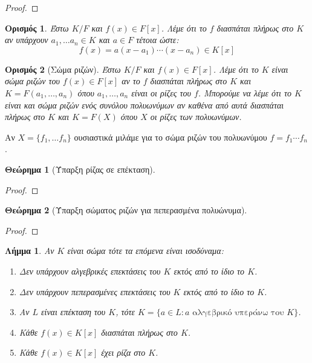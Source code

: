 \documentclass[oneside,a4paper]{article}
\newtheorem{theorem}{Θεώρημα}
\newtheorem{lemma}{Λήμμα}
\newtheorem*{defn}{Ορισμός}
\begin{document}
\begin{proof}
\end{proof}

\begin{defn} Έστω $K/F$ και $f(x) \in F[x]$. Λέμε ότι το $f$ διασπάται πλήρως στο $K$ αν υπάρχουν $a_1 , \ldots a_n \in K$ και $a \in F$ τέτοια ώστε:
	$$f(x) = a (x-a_1)\cdots (x-a_n) \in K[x]$$
\end{defn}

\begin{defn}[Σώμα ριζών]
	Έστω $K/F$ και $f(x) \in F[x]$. Λέμε ότι το $K$ είναι σώμα ριζών του $f(x) \in F[x]$ αν το $f$ διασπάται πλήρως στο $K$ και $K=F(a_1 , \ldots, a_n)$ όπου $a_1 ,\ldots ,a_n$ είναι οι ρίζες του $f$. Μπορούμε να λέμε ότι το $K$ είναι και σώμα ριζών ενός συνόλου πολυωνύμων αν καθένα από αυτά διασπάται πλήρως στο $K$ και $K=F(X)$ όπου $X$ οι ρίζες των πολυωνύμων.
\end{defn}

Aν $X = \{f_1 , \ldots f_n\}$ ουσιαστικά μιλάμε για το σώμα ριζών του πολυωνύμου $f = f_1 \cdots f_n$.

\begin{theorem} [Ύπαρξη ρίζας σε επέκταση]
\end{theorem}

\begin{proof}
\end{proof}

\begin{theorem}[Ύπαρξη σώματος ριζών για πεπερασμένα πολυώνυμα]
\end{theorem}

\begin{proof}
\end{proof}

\begin{lemma} \label{3.10}
	Αν $K$ είναι σώμα τότε τα επόμενα είναι ισοδύναμα:
	\begin{enumerate}
		\item Δεν υπάρχουν αλγεβρικές επεκτάσεις του $K$ εκτός από το ίδιο το $K$.
		\item Δεν υπάρχουν πεπερασμένες επεκτάσεις του $K$ εκτός από το ίδιο το $K$.
		\item Αν $L$ είναι επέκταση του $K$, τότε $K = \{a \in L: a \text{ αλγεβρικό υπεράνω του } K \}$.
		\item Κάθε $f(x) \in K[x]$ διασπάται πλήρως στο $K$.
		\item Κάθε $f(x) \in K[x]$ έχει ρίζα στο $K$. 
	\end{enumerate}
\end{lemma}
\end{document}
